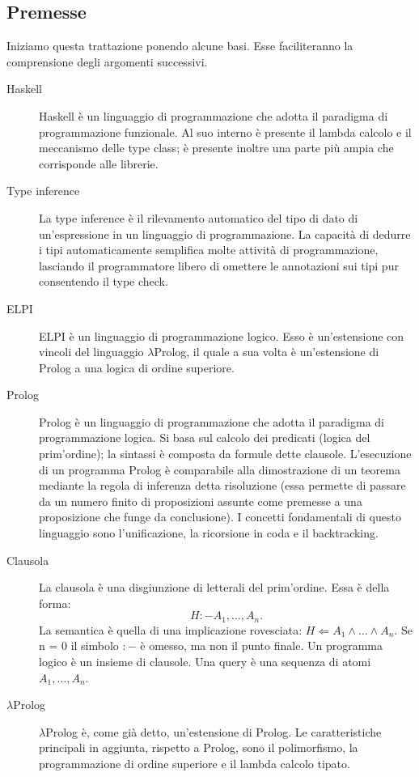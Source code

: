\documentclass[12pt,a4paper,openright,twoside]{report}
\begin{document}
\subsection{Premesse}
Iniziamo questa trattazione ponendo alcune basi. Esse faciliteranno la comprensione degli argomenti successivi.
\begin{description}
 \item[Haskell] Haskell è un linguaggio di programmazione che adotta il paradigma di programmazione funzionale. Al suo interno è presente il lambda calcolo e il meccanismo delle type class; è presente inoltre una parte più ampia che corrisponde alle librerie.
 \item[Type inference] La type inference è il rilevamento automatico del tipo di dato di un'espressione in un linguaggio di programmazione. La capacità di dedurre i tipi automaticamente semplifica molte attività di programmazione, lasciando il programmatore libero di omettere le annotazioni sui tipi pur consentendo il type check.
 \item[ELPI] ELPI è un linguaggio di programmazione logico. Esso è un'estensione con vincoli del linguaggio $\lambda$Prolog, il quale a sua volta è un'estensione di Prolog a una logica di ordine superiore.
 \item[Prolog] Prolog è un linguaggio di programmazione che adotta il paradigma di programmazione logica. Si basa sul calcolo dei predicati (logica del prim'ordine); la sintassi è composta da formule dette clausole. L'esecuzione di un programma Prolog è comparabile alla dimostrazione di un teorema mediante la regola di inferenza detta risoluzione (essa permette di passare da un numero finito di proposizioni assunte come premesse a una proposizione che funge da conclusione). I concetti fondamentali di questo linguaggio sono l'unificazione, la ricorsione in coda e il backtracking.
 \item[Clausola] La clausola è una disgiunzione di letterali del prim'ordine. Essa è della forma:
 \begin{equation}
  H :- A_1,\ldots,A_n.
 \end{equation}
 La semantica è quella di una implicazione rovesciata: $H \Leftarrow A_1 \wedge \ldots \wedge A_n$. Se n = 0 il simbolo $:-$ è omesso, ma non il punto finale. Un programma logico è un insieme di clausole. Una query è una sequenza di atomi $A_1,\ldots,A_n$.
 \item[$\lambda$Prolog] $\lambda$Prolog è, come già detto, un'estensione di Prolog. Le caratteristiche principali in aggiunta, rispetto a Prolog, sono il polimorfismo, la programmazione di ordine superiore e il lambda calcolo tipato.
\end{description}
\end{document}
